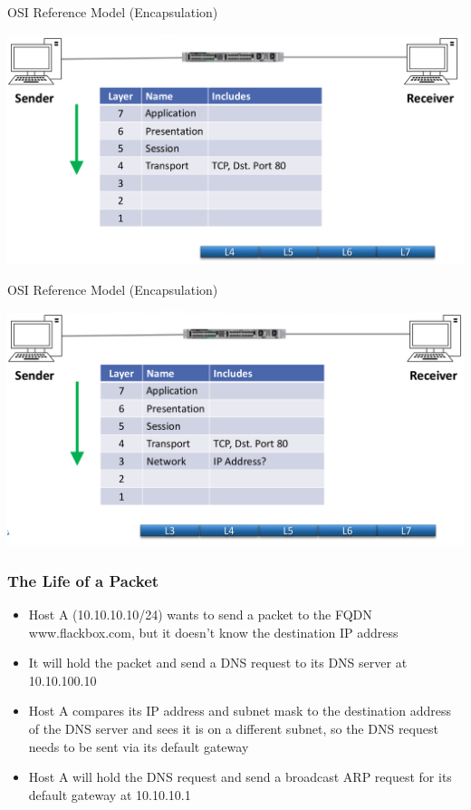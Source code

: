 \documentclass[pdflatex,compress,mathserif]{beamer}
\begin{document}
\begin{frame}{OSI Reference Model (Encapsulation)}
	\begin{center}
		\includegraphics[width=\linewidth]{img/img15}
	\end{center}
\end{frame}


\begin{frame}{OSI Reference Model (Encapsulation)}
	\begin{center}
		\includegraphics[width=\linewidth]{img/img16}
	\end{center}
\end{frame}

\begin{frame}
	\frametitle{The Life of a Packet}
	\begin{itemize}
		\item Host A (10.10.10.10/24) wants to send a packet to the FQDN www.flackbox.com, but it doesn’t know the destination IP address
		\item It will hold the packet and send a DNS request to its DNS server at 10.10.100.10
		\item Host A compares its IP address and subnet mask to the destination address of the DNS server and sees it is on a different subnet, so the DNS request needs to be sent via its default gateway
		\item Host A will hold the DNS request and send a broadcast ARP request for its default gateway at 10.10.10.1
	\end{itemize}
\end{frame}
\end{document}
